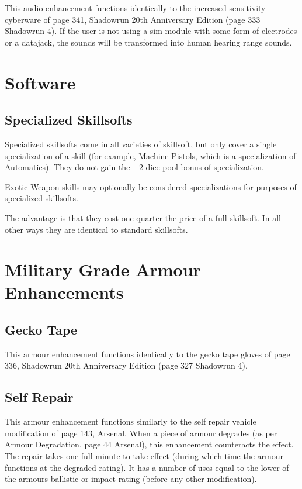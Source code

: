 \documentclass{article}
\begin{document}
This audio enhancement functions identically to the increased sensitivity cyberware of page 341, Shadowrun 20th Anniversary Edition (page 333 Shadowrun 4).  If the user is not using a sim module with some form of electrodes or a datajack, the sounds will be transformed into human hearing range sounds.

\section*{Software}
\subsection*{Specialized Skillsofts}

Specialized skillsofts come in all varieties of skillsoft, but only
cover a single specialization of a skill (for example, Machine
Pistols, which is a specialization of Automatics).  They do not gain the +2
dice pool bonus of specialization.

Exotic Weapon skills may optionally be considered specializations for
purposes of specialized skillsofts.

The advantage is that they cost one quarter the price of a full
skillsoft.  In all other ways they are identical to standard skillsofts.

\section*{Military Grade Armour \newline Enhancements}

\subsection*{Gecko Tape}

This armour enhancement functions identically to the gecko tape gloves of page 336, Shadowrun 20th Anniversary Edition (page 327 Shadowrun 4).

\subsection*{Self Repair}

This armour enhancement functions similarly to the self repair vehicle modification of page 143, Arsenal.  When a piece of armour degrades (as per Armour Degradation, page 44 Arsenal), this enhancement counteracts the effect.  The repair takes one full minute to take effect (during which time the armour functions at the degraded rating).  It has a number of uses equal to the lower of the armours ballistic or impact rating (before any other modification).
\end{document}
